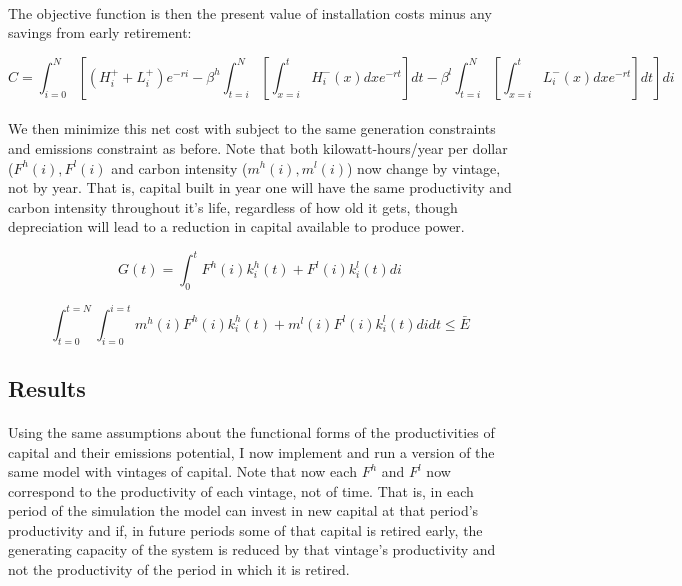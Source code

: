 \documentclass{article}
\begin{document}
\paragraph{} The objective function is then the present value of installation costs minus any savings from early retirement:

\begin{equation}\label{eq:VintObj}
C = \int_{i=0}^N  \left[ (H^+_i + L^+_i)e^{-ri}  - \beta^h  \int_{t=i}^N \left[\int_{x=i}^t H^-_i(x) dx e^{-rt}\right] dt - \beta^l  \int_{t=i}^N \left[\int_{x=i}^t L^-_i(x) dx e^{-rt}\right] dt\right] di
\end{equation}

\paragraph{} We then minimize this net cost with subject to the same generation constraints and emissions constraint as before. Note that both kilowatt-hours/year per dollar ($F^h(i), F^l(i)$ and carbon intensity ($m^h(i), m^l(i)$) now change by vintage, not by year. That is, capital built in year one will have the same productivity and carbon intensity throughout it's life, regardless of how old it gets, though depreciation will lead to a reduction in capital available to produce power. 

\begin{equation}
G(t) = \int_0^t F^h(i)k_i^h(t) + F^l(i)k_i^l(t) di
\end{equation}

\begin{equation}
\int_{t=0}^{t=N}\int_{i=0}^{i=t} m^h(i)F^h(i)k_i^h(t) + m^l(i)F^l(i)k_i^l(t) di dt \leq \bar{E}
\end{equation}

\subsection{Results}

\paragraph{} Using the same assumptions about the functional forms of the productivities of capital and their emissions potential, I now implement and run a version of the same model with vintages of capital. Note that now each $F^h$ and $F^l$ now correspond to the productivity of each vintage, not of time. That is, in each period of the simulation the model can invest in new capital at that period's productivity and if, in future periods some of that capital is retired early, the generating capacity of the system is reduced by that vintage's productivity and not the productivity of the period in which it is retired. 
\end{document}
